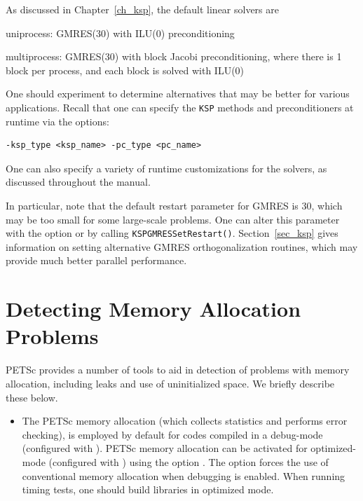 {{As discussed in Chapter~\ref{ch_ksp}, the default linear solvers are
\begin{tightitemize}
\item uniprocess: GMRES(30) with ILU(0) preconditioning\\
\item multiprocess: GMRES(30) with block Jacobi preconditioning, where there
                     is 1 block per process, and each block is solved with ILU(0)\\
\end{tightitemize}
One should experiment to determine alternatives that may be better for
various applications.  Recall that one can specify the \lstinline{KSP} methods and
preconditioners at runtime via the options:
\begin{lstlisting}
-ksp_type <ksp_name> -pc_type <pc_name>
\end{lstlisting}
One can also specify a variety of runtime customizations for the
solvers, as discussed throughout the manual.

In particular, note that the default restart parameter for GMRES is
30, which may be too small for some large-scale problems.  One can alter this
parameter with the option  or by
calling \lstinline{KSPGMRESSetRestart()}. Section~\ref{sec_ksp} gives
information on setting alternative GMRES orthogonalization routines,
which may provide much better parallel performance.

\section{Detecting Memory Allocation Problems}

PETSc provides a number of tools to aid in detection of problems
with memory allocation, including leaks and use of uninitialized space.
We briefly describe these below.
 

\begin{itemize}

\item The PETSc memory allocation (which collects statistics and
performs error checking), is employed by default for codes compiled in
a debug-mode (configured with ).  PETSc memory
allocation can be activated for optimized-mode (configured with
) using the option . The option
 forces the use of conventional memory allocation when
debugging is enabled.  When running timing tests, one should build
libraries in optimized mode.


\end{itemize}}}
